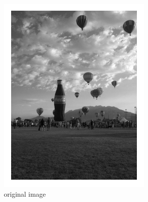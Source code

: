 \newpage
\vfill
\begin{figure}[ht]
\begin{minipage}[b]{0.45\linewidth}
\centering
\includegraphics[width=\textwidth]{figures/coke_balloon_0iters.pdf}
\caption*{original image}
\end{minipage}
\hspace{0.5cm}
\begin{minipage}[b]{0.45\linewidth}
\centering

\end{minipage}
\end{figure}

